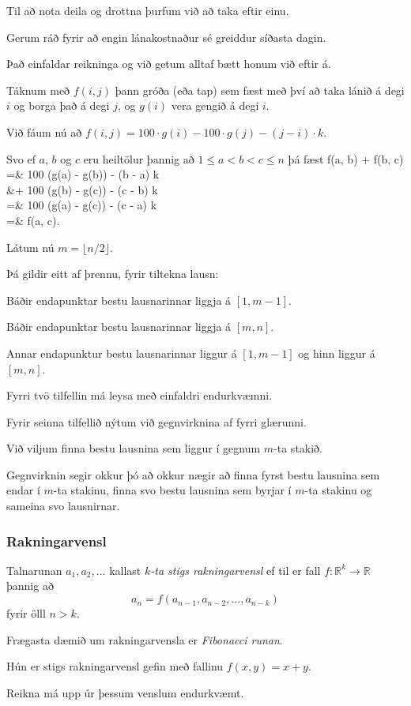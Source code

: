 {
	{
		\item<1-> Til að nota deila og drottna þurfum við að taka eftir einu.
		\item<2-> Gerum ráð fyrir að engin lánakostnaður sé greiddur síðasta dagin.
		\item<3-> Það einfaldar reikninga og við getum alltaf bætt honum við eftir á.
		\item<4-> Táknum með $f(i, j)$ þann gróða (eða tap) sem fæst með því að taka lánið á degi $i$ og borga það á degi $j$,
					og $g(i)$ vera gengið á degi $i$.
		\item<5-> Við fáum nú að $f(i, j) = 100 \cdot g(i) - 100 \cdot g(j) - (j - i) \cdot k$.
		\item<6-> Svo ef $a$, $b$ og $c$ eru heiltölur þannig að $1 \leq a < b < c \leq n$ þá fæst
		{
			f(a, b) + f(b, c) =& 100 \cdot (g(a) - g(b)) - (b - a) \cdot k\\
						       &+ 100 \cdot (g(b) - g(c)) - (c - b) \cdot k\\
						      =& 100 \cdot (g(a) - g(c)) - (c - a) \cdot k\\
						      =& f(a, c).
		}
	}
}

{
	{
		\item<1-> Látum nú $m = \lfloor n/2 \rfloor$.
		\item<2-> Þá gildir eitt af þrennu, fyrir tiltekna lausn:
		{
			\item<3-> Báðir endapunktar bestu lausnarinnar liggja á $[1, m - 1]$.
			\item<4-> Báðir endapunktar bestu lausnarinnar liggja á $[m, n]$.
			\item<5-> Annar endapunktur bestu lausnarinnar liggur á $[1, m - 1]$ og hinn liggur á $[m, n]$.
		}
		\item<6-> Fyrri tvö tilfellin má leysa með einfaldri endurkvæmni.
		\item<7-> Fyrir seinna tilfellið nýtum við gegnvirknina af fyrri glærunni.
		\item<8-> Við viljum finna bestu lausnina sem liggur í gegnum $m$-ta stakið.
		\item<9-> Gegnvirknin segir okkur þó að okkur nægir að finna fyrst bestu lausnina sem endar í $m$-ta stakinu,
					finna svo bestu lausnina sem byrjar í $m$-ta stakinu og
					sameina svo lausnirnar.
	}
}

{
}

{
	\frametitle{Rakningarvensl}
	{
		\item<1-> Talnarunan $a_1, a_2, ...$ kallast \emph{$k$-ta stigs rakningarvensl} ef til er fall
					$f \colon \mathbb{R}^k \rightarrow \mathbb{R}$ þannig að
					\[
						a_n = f(a_{n - 1}, a_{n - 2}, ..., a_{n - k})
					\]
					fyrir ölll $n > k$.
		\item<2-> Frægasta dæmið um rakningarvensla er \emph{Fibonacci runan}.
		\item<3-> Hún er  stigs rakningarvensl gefin með fallinu $f(x, y) = x + y$.
		\item<5-> Reikna má upp úr þessum venslum endurkvæmt.
	}
}

